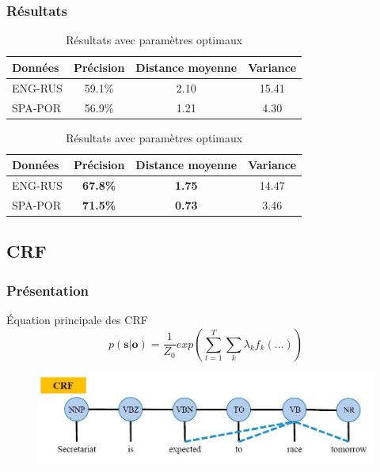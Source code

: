 \documentclass{beamer}
\begin{document}
\begin{frame}
    \frametitle{Résultats}
\begin{table}[H]
\caption{Résultats de la baseline (paramètres par défaut)}
\label{table_baseline_smt}
\begin{tabular}{|l|c|c|c|}
\hline
Données&Précision&Distance moyenne&Variance\\
\hline
ENG-RUS&59.1\%&2.10&15.41\\
\hline
SPA-POR&56.9\%&1.21&4.30\\
\hline
\end{tabular}

\caption{Résultats avec paramètres optimaux}
\label{table_opt_smt}
\begin{tabular}{|l|c|c|c|}
\hline
Données&Précision&Distance moyenne&Variance\\
\hline
ENG-RUS&\textbf{67.8\%}&\textbf{1.75}&14.47\\
\hline
SPA-POR&\textbf{71.5\%}&\textbf{0.73}&3.46\\
\hline
\end{tabular}
\end{table}
\end{frame}



\subsection{CRF}


\begin{frame}
\tableofcontents[sectionstyle=show/shaded, subsectionstyle=show/shaded/hide] 
\end{frame}

\begin{frame}
\frametitle{Présentation}
    \begin{block}{Équation principale des CRF}
        \begin{equation}
            p(\textbf{s}|\textbf{o}) = \frac{1}{Z_0}exp(\sum_{t=1}^T\sum_k \lambda_k f_k(...))
            \label{eqcrf}
        \end{equation}
    \end{block}
    \begin{figure}[H]
        \label{imagecrf}
        \centering
        \vspace{0.3cm}
        \includegraphics[width=\textwidth]{crf.png}
    \end{figure}

\end{frame}
\end{document}
